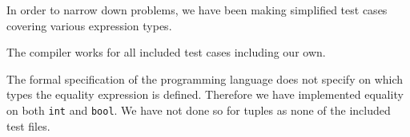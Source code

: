 \documentclass{article}
\begin{document}
In order to narrow down problems, we have been making simplified test cases covering various expression types.

The compiler works for all included test cases including our own.


The formal specification of the programming language does not specify on which types the equality expression is defined. Therefore we have implemented equality on both {\tt int} and {\tt bool}. We have not done so for tuples as none of the included test files.
\end{document}
